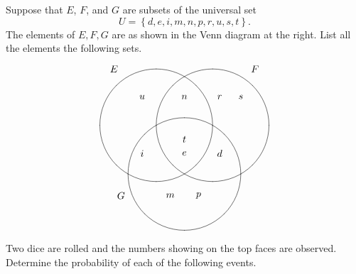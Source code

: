 \documentclass[addpoints,12pt]{exam}
\begin{document}
\begin{questions}

\begin{multicols}{2}
\question[12]
Suppose that $E$, $F$, and $G$ are subsets
of the universal set \[U=\left\{d,e,i,m,n,p,r,u,s,t\right\}.\]
The elements of
$E,F,G$ are as shown in the Venn diagram
at the right.
List all the elements the following sets.
\[\begin{xy}<1cm,0cm>:
(-2.5,2)*{E};
(2.5,2)*{F};
(-2.25,-2.5)*{G};
(-1,0)*\cir<2cm>{};
(1,0)*\cir<2cm>{};
(0,-1.732)*\cir<2cm>{};
(-1.5,1)*{u};
(-1.5,-1)*{i};
(0,1)*{n};
(0,-.5)*{t};
(0,-1)*{e};
(1.25,1)*{r};
(1.25,-1)*{d};
(2,1)*{s};
(-.5,-2.5)*{m};
(.5,-2.5)*{p};
\end{xy}\]
\end{multicols}
\ifprintanswers\else\newpage\fi

\question[24] Two dice are rolled and the
numbers showing on the top faces are observed.
Determine the probability of each of the following events.
\end{questions}
\end{document}

